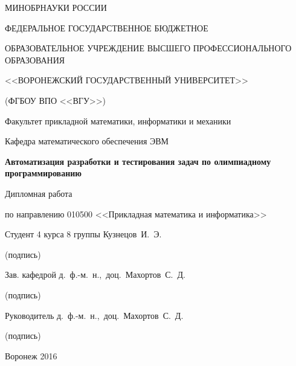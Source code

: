 \thispagestyle{empty}

{\large
\begin{center}
МИНОБРНАУКИ РОССИИ\par
ФЕДЕРАЛЬНОЕ ГОСУДАРСТВЕННОЕ БЮДЖЕТНОЕ\par
ОБРАЗОВАТЕЛЬНОЕ УЧРЕЖДЕНИЕ ВЫСШЕГО ПРОФЕССИОНАЛЬНОГО ОБРАЗОВАНИЯ\par
<<ВОРОНЕЖСКИЙ ГОСУДАРСТВЕННЫЙ УНИВЕРСИТЕТ>>\par
(ФГБОУ ВПО <<ВГУ>>)\par
\vspace{7mm}

Факультет прикладной математики, информатики и механики\par
\vspace{3mm}
Кафедра математического обеспечения ЭВМ\par
\vspace{18mm}

\textbf{Автоматизация разработки и тестирования задач по олимпиадному программированию}\par
\vspace{10mm}

Дипломная работа\par
\vspace{5mm}
по направлению 010500 <<Прикладная математика и информатика>>\par
\vspace{13mm}
\end{center}

Студент 4 курса 8 группы \underline{\qquad\qquad\qquad} Кузнецов~И.~Э.\par
\qquad\qquad\qquad\qquad\qquad\qquad\quad(подпись)\par
\vspace{2mm}
Зав. кафедрой \underline{\qquad\qquad\qquad} д.~ф.-м.~н.,~доц.~Махортов~С.~Д.\par
\qquad\qquad\qquad\qquad(подпись)\par
\vspace{2mm}
Руководитель \underline{\qquad\qquad\qquad} д.~ф.-м.~н.,~доц.~Махортов~С.~Д.\par
\qquad\qquad\qquad\qquad(подпись)\par
\vspace{23mm}

\begin{center}
Воронеж 2016
\end{center}}